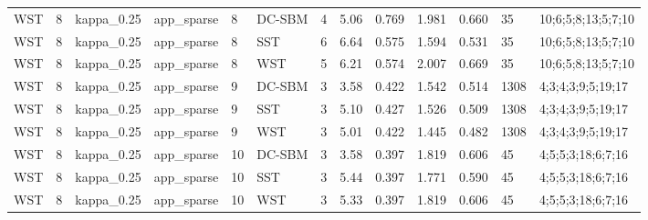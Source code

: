 \begin{table}[!h]
\begin{tabular}[t]{lllllllllllll}
WST & 8 & kappa_0.25 & app_sparse & 8 & DC-SBM & 4 & 5.06 & 0.769 & 1.981 & 0.660 & 35 & 10;6;5;8;13;5;7;10\\
WST & 8 & kappa_0.25 & app_sparse & 8 & SST & 6 & 6.64 & 0.575 & 1.594 & 0.531 & 35 & 10;6;5;8;13;5;7;10\\
WST & 8 & kappa_0.25 & app_sparse & 8 & WST & 5 & 6.21 & 0.574 & 2.007 & 0.669 & 35 & 10;6;5;8;13;5;7;10\\
WST & 8 & kappa_0.25 & app_sparse & 9 & DC-SBM & 3 & 3.58 & 0.422 & 1.542 & 0.514 & 1308 & 4;3;4;3;9;5;19;17\\
WST & 8 & kappa_0.25 & app_sparse & 9 & SST & 3 & 5.10 & 0.427 & 1.526 & 0.509 & 1308 & 4;3;4;3;9;5;19;17\\
WST & 8 & kappa_0.25 & app_sparse & 9 & WST & 3 & 5.01 & 0.422 & 1.445 & 0.482 & 1308 & 4;3;4;3;9;5;19;17\\
WST & 8 & kappa_0.25 & app_sparse & 10 & DC-SBM & 3 & 3.58 & 0.397 & 1.819 & 0.606 & 45 & 4;5;5;3;18;6;7;16\\
WST & 8 & kappa_0.25 & app_sparse & 10 & SST & 3 & 5.44 & 0.397 & 1.771 & 0.590 & 45 & 4;5;5;3;18;6;7;16\\
WST & 8 & kappa_0.25 & app_sparse & 10 & WST & 3 & 5.33 & 0.397 & 1.819 & 0.606 & 45 & 4;5;5;3;18;6;7;16\\
\bottomrule
\end{tabular}
\end{table}
